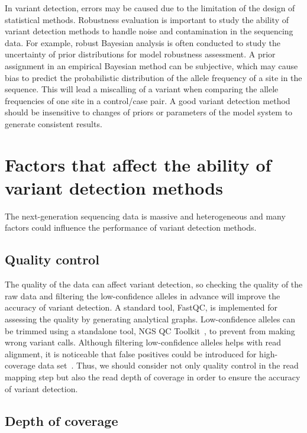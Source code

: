 \documentclass[a4,center,fleqn]{NAR}
\begin{document}
In variant detection, errors may be caused due to the limitation of the design of statistical methods.
Robustness evaluation is important to study the ability of variant detection methods to handle noise and contamination in the sequencing data. 
For example, robust Bayesian analysis is often conducted to study the uncertainty of prior distributions for model robustness assessment.
A prior assignment in an empirical Bayesian method can be subjective, which may cause bias to predict the probabilistic distribution of the allele frequency of a site in the sequence.
This will lead a miscalling of a variant when comparing the allele frequencies of one site in a control/case pair.
A good variant detection method should be insensitive to changes of priors or parameters of the model system to generate consistent results.


\section{Factors that affect the ability of variant detection methods}

The next-generation sequencing data is massive and heterogeneous and many factors could influence the performance of variant detection methods.
\subsection{Quality control}

The quality of the data can affect variant detection, so checking the quality of the raw data and filtering the low-confidence alleles in advance will improve the accuracy of variant detection.
A standard tool, FastQC, is implemented for assessing the quality by generating analytical graphs.
Low-confidence alleles can be trimmed using a standalone tool, NGS QC Toolkit~\citep{patel2012ngs}, to prevent from making wrong variant calls.
Although filtering low-confidence alleles helps with read alignment, it is noticeable that false positives could be introduced for high-coverage data set~\citep{liu2012steps}.
Thus, we should consider not only quality control in the read mapping step but also the read depth of coverage in order to ensure the accuracy of variant detection.

\subsection{Depth of coverage}
\end{document}
